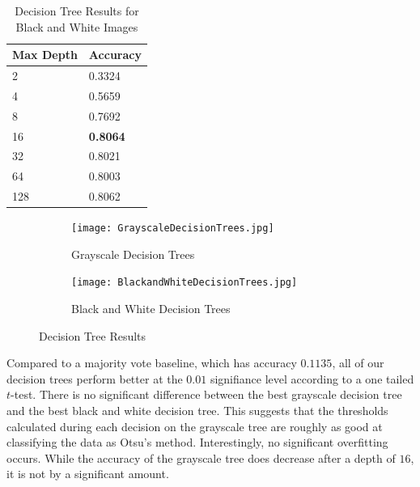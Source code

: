 \documentclass[12pt]{article}
\begin{document}
\begin{table}[ht!]
\centering
\caption{Decision Tree  Results for Black and White Images}
    \begin{tabular}{|l|l|}
    \hline
    Max Depth & Accuracy \\ \hline
    2      & 0.3324   \\ \hline
    4      & 0.5659   \\ \hline
    8      & 0.7692   \\ \hline
    16      & \textbf{0.8064}   \\ \hline
    32     & 0.8021   \\ \hline
	 64     & 0.8003   \\ \hline
   128    & 0.8062   \\ \hline
    \end{tabular}
\end{table}

\begin{figure}[h]
\centering
\begin{subfigure}{.45\textwidth}
  \centering
  \texttt{[image: GrayscaleDecisionTrees.jpg]}
  \caption{Grayscale Decision Trees}
  \label{fig:sub1}
\end{subfigure}%
\hspace{2mm}
\begin{subfigure}{.45\textwidth}
  \centering
  \texttt{[image: BlackandWhiteDecisionTrees.jpg]}
  \caption{Black and White Decision Trees}
  \label{fig:sub2}
\end{subfigure}
\caption{Decision Tree Results}
\label{fig:test}
\end{figure}

Compared to a majority vote baseline, which has accuracy $0.1135$, all of our decision trees perform better at the $0.01$ signifiance level according to a one tailed $t$-test. There is no significant difference between the best grayscale decision tree and the best black and white decision tree. This suggests that the thresholds calculated during each decision on the grayscale tree are roughly as good at classifying the data as Otsu's method. Interestingly, no significant overfitting occurs. While the accuracy of the grayscale tree does decrease after a depth of $16$, it is not by a significant amount.
\end{document}
